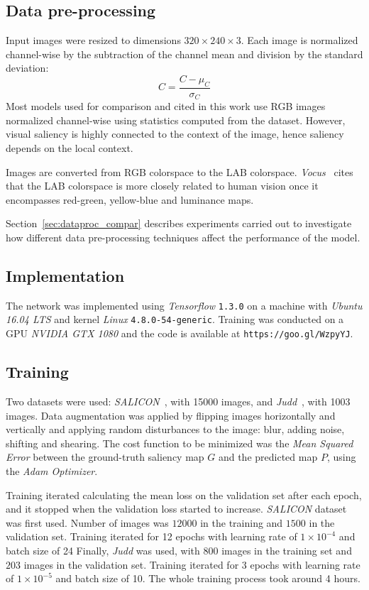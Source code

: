 \documentclass[10pt,twocolumn,letterpaper]{article}
\begin{document}
\subsection{Data pre-processing}
Input images were resized to dimensions $320\times240\times3$.
Each image is normalized channel-wise by the subtraction of
the channel mean and division by the standard deviation:
$$C = \frac{C - \mu_C}{\sigma_C}$$
Most models used for comparison and cited in this work use RGB images
normalized channel-wise using statistics computed from the dataset.
However, visual saliency is highly connected to the context of the
image, hence saliency depends on the local context.

Images are converted from RGB colorspace to the LAB colorspace.
\emph{Vocus}~\cite{frintrop_2005} cites that the
LAB colorspace is more closely related to human vision once it encompasses
red-green, yellow-blue and
luminance maps.

Section~\ref{sec:dataproc_compar} describes experiments carried out
to investigate how different data pre-processing techniques affect the
performance of the model.

\subsection{Implementation}
The network was implemented using \emph{Tensorflow} \texttt{1.3.0}
on a machine with \emph{Ubuntu 16.04 LTS} and
kernel \emph{Linux} \texttt{4.8.0-54-generic}.
Training was conducted on a GPU \emph{NVIDIA GTX 1080} and the
code is available at \texttt{https://goo.gl/WzpyYJ}.

\subsection{Training}
Two datasets were used:
\emph{SALICON}~\cite{jiang_2015}, with 15000 images, and
\emph{Judd}~\cite{judd}, with 1003 images.
Data augmentation was applied by flipping images
horizontally and vertically and applying random disturbances to the image:
blur, adding noise, shifting and shearing.
The cost function to be minimized was the \emph{Mean Squared Error} between
the ground-truth saliency map $G$ and the predicted map $P$, using
the \emph{Adam Optimizer}.

Training iterated calculating the mean loss on the validation set
after each epoch, and it stopped when the validation loss started to increase.
\emph{SALICON} dataset was first used.
Number of images was $12000$ in the training and $1500$ in the validation set.
Training iterated for 12 epochs with learning rate of $1\times10^{-4}$
and batch size of 24
Finally, \emph{Judd} was used, with $800$ images in the training set
and $203$ images in the validation set.
Training iterated for 3 epochs with learning rate of $1\times10^{-5}$
and batch size of 10.
The whole training process took around 4 hours.
\end{document}
